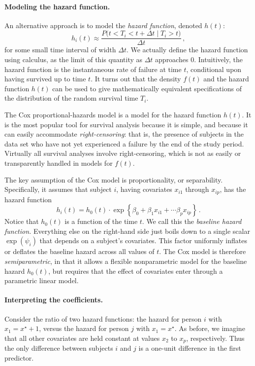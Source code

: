 \documentclass[11pt]{article}
\newcommand{\1}[1]{\mathbf{1}_{\{ {#1} \}}}
\begin{document}
\paragraph{Modeling the hazard function.}

An alternative approach is to model the \textit{hazard function}, denoted $h(t)$:
$$
h_i(t) \approx \frac{P \big(t < T_i < t + \Delta t \mid  T_i > t \big) }{\Delta t}  \, ,
$$
for some small time interval of width $\Delta t$.  We actually define the hazard function using calculus, as the limit of this quantity as $\Delta t$ approaches 0.  Intuitively, the hazard function is the instantaneous rate of failure at time $t$, conditional upon having survived up to time $t$.  It turns out that the density $f(t)$ and the hazard function $h(t)$ can be used to give mathematically equivalent specifications of the distribution of the random survival time $T_i$.

The Cox proportional-hazards model is a model for the hazard function $h(t)$.  It is the most popular tool for survival analysis because it is simple, and because it can easily accommodate \textit{right-censoring}: that is, the presence of subjects in the data set who have not yet experienced a failure by the end of the study period.  Virtually all survival analyses involve right-censoring, which is not as easily or transparently handled in models for $f(t)$.

The key assumption of the Cox model is proportionality, or separability.  Specifically, it assumes that subject $i$, having covariates $x_{i1}$ through $x_{ip}$, has the hazard function
$$
h_i(t) = h_0(t) \cdot \exp \left\{ \beta_0 + \beta_1 x_{i1} + \cdots \beta_p x_{ip} \right\} \, .
$$
Notice that $h_0(t)$ is a function of the time $t$.  We call this the \textit{baseline hazard function.}  Everything else on the right-hand side just boils down to a single scalar $\exp (\psi_i) $ that depends on a subject's covariates.  This factor uniformly inflates or deflates the baseline hazard across all values of $t$.  The Cox model is therefore \textit{semiparametric}, in that it allows a flexible nonparametric model for the baseline hazard $h_0(t)$, but requires that the effect of covariates enter through a parametric linear model.

\paragraph{Interpreting the coefficients.}

Consider the ratio of two hazard functions: the hazard for person $i$ with $x_1 = x^{\star} + 1$, versus the hazard for person $j$ with $x_1 = x^{\star}$.  As before, we imagine that all other covariates are held constant at values $x_2$ to $x_p$, respectively.  Thus the only difference between subjects $i$ and $j$ is a one-unit difference in the first predictor.
\end{document}

